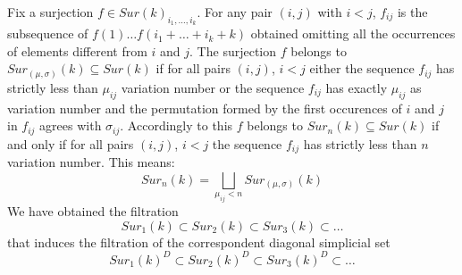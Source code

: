 	\begin{definition}
		Fix a surjection $f\in Sur(k)_{i_{1},\dots,i_{k}}$. For any pair $(i,j)$ with $i< j$, $f_{ij}$ is the subsequence of $f(1) \dots f(i_1+\dots+i_k+k)$ obtained omitting all the occurrences of elements different from $i$ and $j$. 
		The surjection $f$ belongs to $Sur_{(\mu,\sigma)}(k)\subseteq Sur(k)$ if for all pairs $(i,j)$, $i< j$ either the sequence $f_{ij}$ has strictly less than $\mu_{ij}$ variation number
		 or the sequence $f_{ij}$ has exactly $\mu_{ij}$ as variation number and the permutation formed by the first occurences of $i$ and $j$ in $f_{ij}$ agrees with $\sigma_{ij}$. Accordingly to this $f$ belongs to $Sur_{n}(k)\subseteq Sur(k)$ if and only if for all pairs $(i,j)$, $i< j$ the sequence $f_{ij}$ has strictly less than $n$ variation number. This means:
		 \begin{equation*}
		 	\label{def}
		 	Sur_{n}(k)=\bigsqcup_{\mu_{ij}< n} Sur_{(\mu,\sigma)}(k)
		 \end{equation*}
	    We have obtained the filtration $$Sur_1(k) \subset Sur_2(k)  \subset Sur_3(k)  \subset \dots $$
	    that induces the filtration of the correspondent diagonal simplicial set 
	    $$Sur_1(k)^{D} \subset Sur_2(k)^{D}  \subset Sur_3(k)^{D}  \subset\dots $$
	    
	\end{definition}

